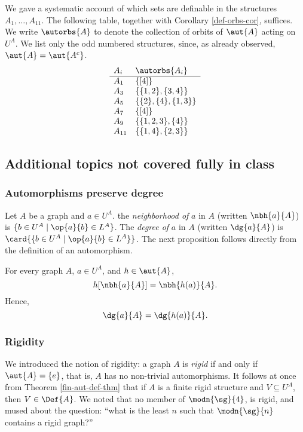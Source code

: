 We %
gave a systematic account of which sets are definable in the structures $A_1,\ldots,A_{11}$. The following table, together with Corollary \ref{def-orbs-cor}, suffices. We write $\autorbs{A}$ to denote the collection of orbits of $\aut{A}$ acting on $U^A$. We list only the odd numbered structures, since, as already observed, $\aut{A}=\aut{A^c}$.
\[
\begin{array}{l l}
A_i & \autorbs{A_i}\\
\hline
A_1 & \{[4]\}\\
A_3 & \{\{1,2\},\{3,4\}\}\\
A_5 & \{\{2\},\{4\},\{1,3\}\}\\
A_7 & \{[4]\}\\
A_9 & \{\{1,2,3\},\{4\}\}\\
A_{11} & \{\{1,4\},\{2,3\}\}
\end{array}
\]
\subsection{Additional topics not covered fully in class}
\subsubsection{Automorphisms preserve degree}

Let $A$ be a graph and $a\in U^A$. the \emph{neighborhood of} $a$ in $A$ (written $\nbh{a}{A}$) is $\{b\in U^A\mid\op{a}{b}\in L^A\}$. The \emph{degree of} $a$ in $A$ (written $\dg{a}{A}$) is $\card{\{b\in U^A\mid\op{a}{b}\in L^A\}}$. The next proposition follows directly from the definition of an automorphism.
\begin{proposition}
For every graph $A$, $a\in U^A$, and $h\in\aut{A}$,
\[
h[\nbh{a}{A}]=\nbh{h(a)}{A}.
\]
Hence,
\[
\dg{a}{A} = \dg{h(a)}{A}.
\]
\end{proposition}
\subsubsection{Rigidity}

We introduced the notion of rigidity: a graph $A$ is \emph{rigid} if and only if $\aut{A}=\{e\}$, that is, $A$ has no non-trivial automorphisms. It follows at once from Theorem \ref{fin-aut-def-thm} that if $A$ is a finite rigid structure and $V\subseteq U^A$, then $V\in\Def{A}$.
We noted that no member of $\modn{\sg}{4}$, is rigid, and mused about the question: ``what is the least $n$ such that $\modn{\sg}{n}$ contains a rigid graph?''

